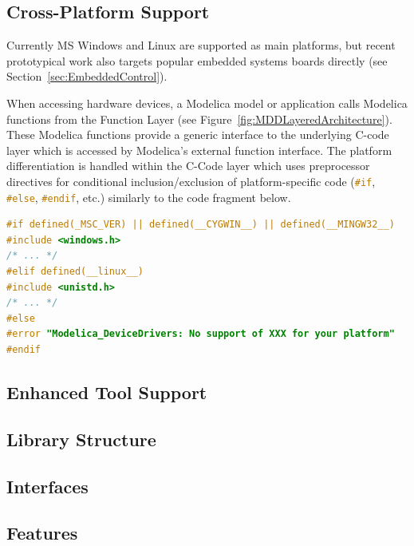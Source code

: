 \documentclass{resources/modelica}
\newcommand{\clang}[1]{\lstinline[language=c]|#1|}
\begin{document}
\subsection{Cross-Platform Support}
\label{sec:CrossPlatformSupport}

Currently MS Windows and Linux are supported as main platforms, but recent
prototypical work also targets popular embedded systems boards directly (see
Section~\ref{sec:EmbeddedControl}).

When accessing hardware devices, a Modelica model or
application calls Modelica functions from the \textsf{Function Layer} (see
Figure~\ref{fig:MDDLayeredArchitecture}). These Modelica functions provide a
generic interface to the underlying C-code layer which is accessed by
Modelica's external function interface.
The platform differentiation is handled within the \textsf{C-Code} layer which
uses preprocessor directives for conditional inclusion/exclusion of
platform-specific code (\mbox{\clang{#if}}, \clang{#else}, \clang{#endif}, etc.)
similarly to the code fragment below.
\begin{lstlisting}[language=C]
#if defined(_MSC_VER) || defined(__CYGWIN__) || defined(__MINGW32__)
#include <windows.h>
/* ... */
#elif defined(__linux__)
#include <unistd.h>
/* ... */
#else
#error "Modelica_DeviceDrivers: No support of XXX for your platform"
#endif
\end{lstlisting}

\subsection{Enhanced Tool Support}
\subsection{Library Structure}
\subsection{Interfaces}

\subsection{Features}
\end{document}
